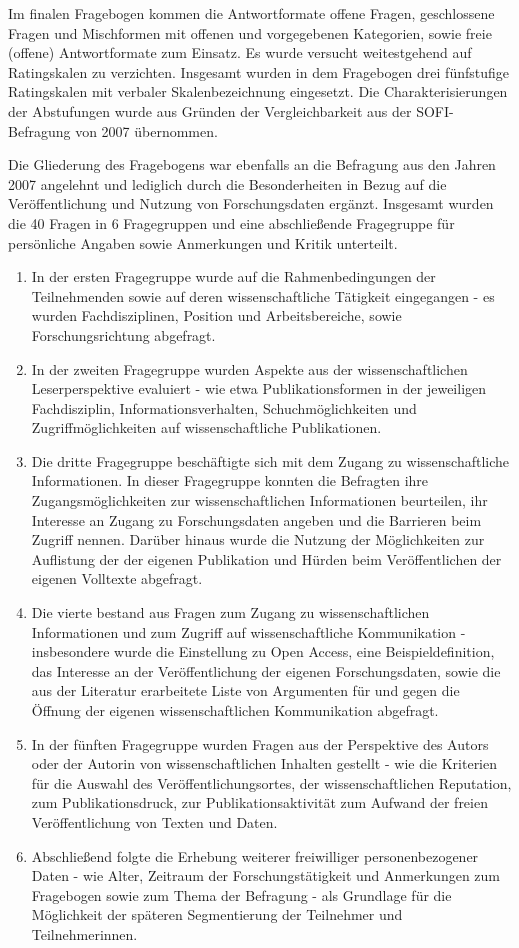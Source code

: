 Im finalen Fragebogen kommen die Antwortformate offene Fragen, geschlossene Fragen und Mischformen mit offenen und vorgegebenen Kategorien, sowie freie (offene) Antwortformate zum Einsatz. Es wurde versucht weitestgehend auf Ratingskalen zu verzichten. Insgesamt wurden in dem Fragebogen drei fünfstufige Ratingskalen mit verbaler Skalenbezeichnung eingesetzt. Die Charakterisierungen der Abstufungen wurde aus Gründen der Vergleichbarkeit aus der SOFI-Befragung von 2007 übernommen.

Die Gliederung des Fragebogens war ebenfalls an die Befragung aus den Jahren 2007 angelehnt und lediglich durch die Besonderheiten in Bezug auf die Veröffentlichung und Nutzung von Forschungsdaten ergänzt. Insgesamt wurden die 40 Fragen in 6 Fragegruppen und eine abschließende Fragegruppe für persönliche Angaben sowie Anmerkungen und Kritik unterteilt.

\begin{enumerate}
\item In der ersten Fragegruppe wurde auf die Rahmenbedingungen der Teilnehmenden sowie auf deren wissenschaftliche Tätigkeit eingegangen - es wurden Fachdisziplinen, Position und Arbeitsbereiche, sowie Forschungsrichtung abgefragt.
\item In der zweiten Fragegruppe wurden Aspekte aus der wissenschaftlichen Leserperspektive evaluiert - wie etwa Publikationsformen in der jeweiligen Fachdisziplin, Informationsverhalten, Schuchmöglichkeiten und Zugriffmöglichkeiten auf wissenschaftliche Publikationen.
\item Die dritte Fragegruppe beschäftigte sich mit dem Zugang zu wissenschaftliche Informationen. In dieser Fragegruppe konnten die Befragten ihre Zugangsmöglichkeiten zur wissenschaftlichen Informationen beurteilen, ihr Interesse an Zugang zu Forschungsdaten angeben und die Barrieren beim Zugriff nennen. Darüber hinaus wurde die Nutzung der Möglichkeiten zur Auflistung der der eigenen Publikation und Hürden beim Veröffentlichen der eigenen Volltexte abgefragt.
\item Die vierte bestand aus Fragen zum Zugang zu wissenschaftlichen Informationen und zum Zugriff auf wissenschaftliche Kommunikation - insbesondere wurde die Einstellung zu Open Access, eine Beispieldefinition, das Interesse an der Veröffentlichung der eigenen Forschungsdaten, sowie die aus der Literatur erarbeitete Liste von Argumenten für und gegen die Öffnung der eigenen wissenschaftlichen Kommunikation abgefragt.
\item In der fünften Fragegruppe wurden Fragen aus der Perspektive des Autors oder der Autorin von wissenschaftlichen Inhalten gestellt - wie die Kriterien für die Auswahl des Veröffentlichungsortes, der wissenschaftlichen Reputation, zum Publikationsdruck, zur Publikationsaktivität zum Aufwand der freien Veröffentlichung von Texten und Daten.
\item Abschließend folgte die Erhebung weiterer freiwilliger personenbezogener Daten - wie Alter, Zeitraum der Forschungstätigkeit und Anmerkungen zum Fragebogen sowie zum Thema der Befragung - als Grundlage für die Möglichkeit der späteren Segmentierung der Teilnehmer und Teilnehmerinnen.
\end{enumerate}

